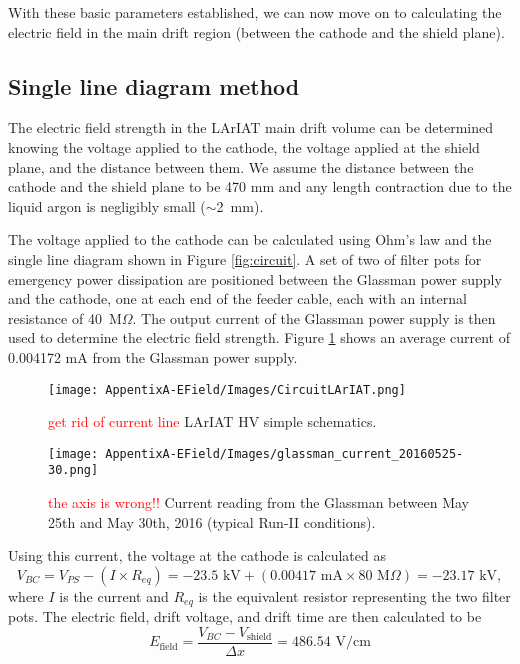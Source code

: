 With these basic parameters established, we can now move on to calculating the electric field in the main drift region (between the cathode and the shield plane).

\subsection*{Single line diagram method}
The electric field strength in the LArIAT main drift volume can be determined knowing the voltage applied to the cathode, the voltage applied at the shield plane, and the distance between them. We assume the distance between the cathode and the shield plane to be 470 mm and any length contraction due to the liquid argon is negligibly small ($\sim$2~mm).

The voltage applied to the cathode can be calculated using Ohm's law and the single line diagram shown in Figure \ref{fig:circuit}.  A set of two of filter pots for emergency power dissipation are positioned between the Glassman power supply and the cathode, one at each end of the feeder cable, each with an internal resistance of 40~M$\Omega$.  The output current of the Glassman power supply is then used to determine the electric field strength.  Figure \ref{fig:currentMeasurement} shows an average current of 0.004172 mA from the Glassman power supply.  

\begin{figure}[h]
\centering
\begin{minipage}{0.45\textwidth}
\centering
\texttt{[image: AppentixA-EField/Images/CircuitLArIAT.png]}
\caption{\textcolor{red}{get rid of current line} LArIAT HV simple schematics.}
\label{fig:circuit}
\end{minipage}\hfill
\begin{minipage}{0.45\textwidth}
\centering
\texttt{[image: AppentixA-EField/Images/glassman\_current\_20160525-30.png]}
\caption{\textcolor{red}{the axis is wrong!!} Current reading from the Glassman between May 25th and May 30th, 2016 (typical Run-II conditions).}
\label{fig:currentMeasurement}
\end{minipage}
\end{figure}

Using this current, the voltage at the cathode is calculated as
\begin{equation} \label{eq:VBC}
V_{BC}=V_{PS} - (I \times R_{eq}) = -23.5\text{ kV} + ( 0.00417\text{ mA} \times 80\text{ M}\Omega ) = -23.17\text{ kV}, 
\end{equation}
where $I$ is the current and $R_{eq}$ is the equivalent resistor representing the two filter pots. The electric field, drift voltage, and drift time are then calculated to be
\begin{equation}E_{\text{field}} = \frac{V_{BC} - V_{\text{shield}}}{\Delta x} = 486.54\text{ V/cm}
\end{equation}



